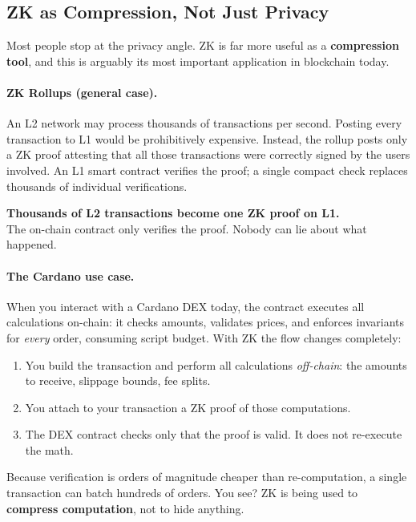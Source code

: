 \subsection*{ZK as Compression, Not Just Privacy}

Most people stop at the privacy angle. ZK is far more useful as a \textbf{compression tool}, and this is arguably its most important application in blockchain today.

\paragraph{ZK Rollups (general case).}
An L2 network may process thousands of transactions per second. Posting every transaction to L1 would be prohibitively expensive. Instead, the rollup posts only a ZK proof attesting that all those transactions were correctly signed by the users involved. An L1 smart contract verifies the proof; a single compact check replaces thousands of individual verifications.

\begin{highlight}
\textbf{Thousands of L2 transactions become one ZK proof on L1.}\\
The on-chain contract only verifies the proof. Nobody can lie about what happened.
\end{highlight}

\paragraph{The Cardano use case.}
When you interact with a Cardano DEX today, the contract executes all calculations on-chain: it checks amounts, validates prices, and enforces invariants for \emph{every} order, consuming script budget. With ZK the flow changes completely:

\begin{enumerate}
  \item You build the transaction and perform all calculations \emph{off-chain}: the amounts to receive, slippage bounds, fee splits.
  \item You attach to your transaction a ZK proof of those computations.
  \item The DEX contract checks only that the proof is valid. It does not re-execute the math.
\end{enumerate}

Because verification is orders of magnitude cheaper than re-computation, a single transaction can batch hundreds of orders. You see? ZK is being used to \textbf{compress computation}, not to hide anything.

